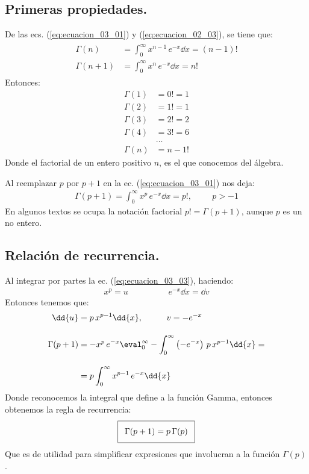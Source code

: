 \subsection{Primeras propiedades.}

De las ecs. (\ref{eq:ecuacion_03_01}) y (\ref{eq:ecuacion_02_03}), se tiene que:
\begin{align}
\begin{aligned}
\Gamma (n) &= \int_{0}^{\infty} x^{n-1} \, e^{-x} \dd{x} = (n -1)! \\[1em]
\Gamma (n+1) &= \int_{0}^{\infty} x^{n} \, e^{-x} \dd{x} = n!
\end{aligned}
\label{eq:ecuacion_03_02}
\end{align}
Entonces:
\begin{align*}
\Gamma (1) &= 0! = 1 \\
\Gamma (2) &= 1! = 1 \\
\Gamma (3) &= 2! = 2 \\
\Gamma (4) &= 3! = 6 \\
&\ldots \\
\Gamma (n) &= n-1!
\end{align*}
Donde el factorial de un entero positivo $n$, es el que conocemos del álgebra.
\par
Al reemplazar $p$ por $p+1$ en la ec. (\ref{eq:ecuacion_03_01}) nos deja:
\begin{align}
\Gamma (p+1) = \int_{0}^{\infty} x^{p} \, e^{-x} \dd{x} = p!, \hspace{1cm} p > -1
\label{eq:ecuacion_03_03}
\end{align}
En algunos textos se ocupa la notación factorial $p! = \Gamma (p + 1)$, aunque $p$ es un no entero.

\subsection{Relación de recurrencia.}

Al integrar por partes la ec. (\ref{eq:ecuacion_03_03}), haciendo:
\begin{align*}
x^{p} =  u \hspace{2cm} e^{-x} \dd{x} =  \dd{v}
\end{align*}
Entonces tenemos que:
\begin{align*}
\dd{u} &= p \, x^{p-1} \dd{x}, \hspace{1cm} v = - e^{-x} \\[1em]
\Gamma (p+1) &= -x^{p} \, e^{-x} \displaystyle \eval_{0}^{\infty} - \displaystyle \int_{0}^{\infty} \left(-e^{-x} \right) \, p \, x^{p-1} \dd{x} = \\[1em]
&= p \displaystyle \int_{0}^{\infty} x^{p-1} \, e^{-x} \dd{x}
\end{align*}
Donde reconocemos la integral que define a la función Gamma, entonces obtenemos la regla de recurrencia:  
\begin{align}\addtolength{\fboxsep}{5pt}\boxed{
\Gamma (p + 1) = p \, \Gamma (p)}
\label{eq:ecuacion_03_04}
\end{align}
Que es de utilidad para simplificar expresiones que involucran a la función $\Gamma (p)$.

